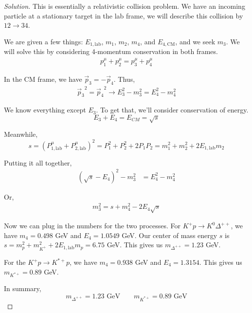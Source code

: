 \documentclass[12pt]{article}
\newenvironment{solution}{\begin{proof}[Solution]}{\end{proof}}
\begin{document}
\begin{solution}

This is essentially a relativistic collision problem. We have an incoming particle at a stationary target in the lab frame, we will describe this collision by $12\rightarrow 34$.

We are given a few things: $E_{1,\text{lab}}$, $m_1$, $m_2$, $m_4$, and $E_{4,\text{CM}}$, and we seek $m_3$. We will solve this by considering 4-momentum conservation in both frames.
\begin{align*}
    p_1^\mu+p_2^\mu=p_3^\mu+p_4^\mu
\end{align*}

In the CM frame, we have $\vec{p}_3=-\vec{p}_4$. Thus,
\begin{align*}
    {\vec{p}_3}^2={\vec{p}_4}^2\rightarrow E_3^2-m_3^2=E_4^2-m_4^2
\end{align*}

We know everything except $E_3$. To get that, we'll consider conservation of energy.
\begin{equation*}
    E_3+E_4=E_{CM}=\sqrt{s}
\end{equation*}

Meanwhile,
\begin{equation*}
    s=(P_{1,\text{lab}}^\mu+P_{2,\text{lab}}^\mu)^2=P_1^2+P_2^2+2P_1P_2=m_1^2+m_2^2+2E_{1,\text{lab}}m_2
\end{equation*}

Putting it all together,
\begin{align*}
    (\sqrt{s}-E_4)^2-m_3^2&=E_4^2-m_4^2
\end{align*}

Or,
\begin{align*}
    m_3^2=s+m_4^2-2E_4\sqrt{s}
\end{align*}

Now we can plug in the numbers for the two processes. For $K^+p\rightarrow K^0\Delta^{++}$, we have $m_4=0.498$ GeV and $E_4=1.0549$ GeV. Our center of mass energy $s$ is $s=m_p^2+m_{K^+}^2+2E_{1,\text{lab}}m_p=6.75$ GeV. This gives us $m_{\Delta^{++}}=1.23$ GeV.

For the $K^+p\rightarrow K^{*+}p$, we have $m_4=0.938$ GeV and $E_4=1.3154$. This gives us $m_{K^{*+}}=0.89$ GeV.

In summary,
\begin{equation*}
    \boxed{m_{\Delta^{++}}=1.23\text{ GeV}\qquad m_{K^{*+}}=0.89\text{ GeV}}
\end{equation*}

\end{solution}
\end{document}
